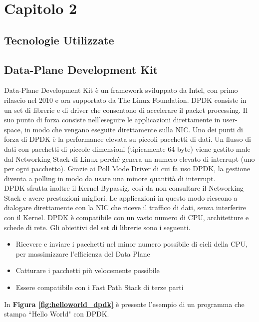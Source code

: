 \chapter*{Capitolo 2}

\section*{Tecnologie Utilizzate}

\section*{Data-Plane Development Kit}

Data-Plane Development Kit è un framework sviluppato da Intel, con primo rilascio nel 2010 e ora supportato da The Linux Foundation. DPDK consiste in un set di librerie e di driver che consentono  di accelerare il packet processing.
Il suo punto di forza consiste nell'eseguire le applicazioni direttamente in user-space, in modo che vengano eseguite direttamente sulla NIC. 
Uno dei punti di forza di DPDK è la performance elevata su piccoli pacchetti di dati.
Un flusso di dati con pacchetti di piccole dimensioni (tipicamente 64 byte) viene gestito male dal Networking Stack di Linux perché genera un numero elevato di interrupt (uno per ogni pacchetto). Grazie ai Poll Mode Driver di cui fa uso DPDK, la gestione diventa a polling in modo da usare una minore quantità di interrupt.\\
DPDK sfrutta inoltre il Kernel Bypassig, così da non consultare il Networking Stack e avere prestazioni migliori.
Le applicazioni in questo modo riescono a dialogare direttamente con la NIC che riceve il traffico di dati, senza interferire con il Kernel.
DPDK è compatibile con un vasto numero di CPU, architetture e schede di rete. Gli obiettivi del set di librerie sono i seguenti.
\begin{itemize}
    \item Ricevere e inviare i pacchetti nel minor numero possibile di cicli della CPU, per massimizzare l'efficienza del Data Plane
    \item Catturare i pacchetti più velocemente possibile
    \item Essere compatibile con i Fast Path Stack di terze parti
\end{itemize} 
\pagebreak
In \textbf{Figura \ref{fig:helloworld_dpdk}} è presente l'esempio di un programma che stampa ``Hello World" con DPDK.
